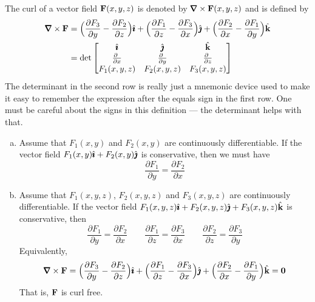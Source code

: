 \begin{defn}\label{def:curl}
The curl of a vector field $\mathbf{F}(x,y,z)$ is denoted by $\vnabla\times\vF(x,y,z)$
and is defined by
\begin{align*}
\vnabla\times\vF
&=\Big(\frac{\partial F_3}{\partial y} -\frac{\partial F_2}{\partial z} \Big)\hi
+\Big(\frac{\partial F_1}{\partial z} -\frac{\partial F_3}{\partial x} \Big)\hj
+\Big(\frac{\partial F_2}{\partial x} -\frac{\partial F_1}{\partial y} \Big)\hk
\\
&=\det\left[\begin{matrix}
                \hi &\hj & \hk \\
                \frac{\partial\ }{\partial x} & \frac{\partial\ }{\partial y}
                      & \frac{\partial\ }{\partial z} \\
                F_1(x,y,z) & F_2(x,y,z) & F_3(x,y,z)
            \end{matrix}\right]
\end{align*}
The determinant in the second row is really just a mnemonic device
used to make it easy to remember the expression after the equals sign 
in the first row. One must be careful about the signs in this definition ---
the determinant helps with that.

\end{defn}




\begin{theorem}
   \label{thm:screen}
\begin{enumerate}[(a)]
\item
Assume that $F_1(x,y)$ and $F_2(x,y)$ are continuously differentiable.
If the vector field $F_1(x,y)\hat{\pmb{\imath}} + F_2(x,y)\hat{\pmb{\jmath}}$ is conservative, then
we must have
\begin{equation*}
\frac{\partial F_1}{\partial y} =  \frac{\partial F_2}{\partial x}
\end{equation*}

\item
Assume that $F_1(x,y,z)$, $F_2(x,y,z)$ and $F_3(x,y,z)$ are continuously differentiable.
If the vector field $F_1(x,y,z)\hat{\pmb{\imath}} + F_2(x,y,z)\hat{\pmb{\jmath}} + F_3(x,y,z)\hat{\mathbf{k}}$ is conservative, then
\begin{equation*}
\frac{\partial F_1}{\partial y} =  \frac{\partial F_2}{\partial x}\qquad
\frac{\partial F_1}{\partial z} =  \frac{\partial F_3}{\partial x}\qquad
\frac{\partial F_2}{\partial z} =  \frac{\partial F_3}{\partial y}
\end{equation*}
Equivalently,
\begin{equation*}
\vnabla\times\vF 
=\Big(\frac{\partial F_3}{\partial y} -\frac{\partial F_2}{\partial z} \Big)\hi
+\Big(\frac{\partial F_1}{\partial z} -\frac{\partial F_3}{\partial x} \Big)\hj
+\Big(\frac{\partial F_2}{\partial x} -\frac{\partial F_1}{\partial y} \Big)\hk
  =\vZero
\end{equation*}
That is, $\mathbf{F}$ is curl free.

\end{enumerate}
\end{theorem}

